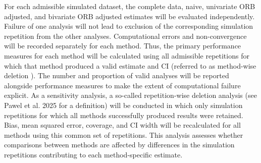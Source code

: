 \documentclass[11pt]{article}
\begin{document}
For each admissible simulated dataset, the complete data, naive, univariate ORB adjusted, and bivariate ORB adjusted estimates will be evaluated independently. Failure of one analysis will not lead to exclusion of the corresponding simulation repetition from the other analyses. Computational errors and non-convergence will be recorded separately for each method. Thus, the primary performance measures for each method will be calculated using all admissible repetitions for which that method produced a valid estimate and CI (referred to as method-wise deletion \cite{pawel2025handling}). The number and proportion of valid analyses will be reported alongside performance measures to make the extent of computational failure explicit. As a sensitivity analysis, a so-called repetition-wise deletion analysis (see Pawel et al. 2025 \cite{pawel2025handling} for a definition) will be conducted in which only simulation repetitions for which all methods successfully produced results were retained. Bias, mean squared error, coverage, and CI width will be recalculated for all methods using this common set of repetitions. This analysis assesses whether comparisons between methods are affected by differences in the simulation repetitions contributing to each method-specific estimate.

\sloppy
\printbibliography
\end{document}
